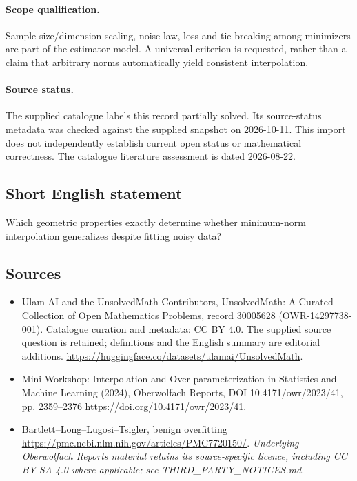 \documentclass[11pt]{article}
\begin{document}
\paragraph{Scope qualification.}
Sample-size/dimension scaling, noise law, loss and tie-breaking among minimizers are part of the estimator model. A universal criterion is requested, rather than a claim that arbitrary norms automatically yield consistent interpolation.
\paragraph{Source status.}
The supplied catalogue labels this record partially solved. Its source-status metadata was checked against the supplied snapshot on 2026-10-11. This import does not independently establish current open status or mathematical correctness. The catalogue literature assessment is dated 2026-08-22.
\subsection{Short English statement}
Which geometric properties exactly determine whether minimum-norm interpolation generalizes despite fitting noisy data?
\subsection{Sources}
\begin{itemize}
\item[S1] Ulam AI and the UnsolvedMath Contributors, UnsolvedMath: A Curated Collection of Open Mathematics Problems, record 30005628 (OWR-14297738-001). Catalogue curation and metadata: CC BY 4.0. The supplied source question is retained; definitions and the English summary are editorial additions.
\url{https://huggingface.co/datasets/ulamai/UnsolvedMath}.
\item[S2] Mini-Workshop: Interpolation and Over-parameterization in Statistics and Machine Learning​ (2024), Oberwolfach Reports, DOI 10.4171/owr/2023/41, pp. 2359--2376
\url{https://doi.org/10.4171/owr/2023/41}.
\item[S3] Bartlett--Long--Lugosi--Tsigler, benign overfitting
\url{https://pmc.ncbi.nlm.nih.gov/articles/PMC7720150/}.
\textit{Underlying Oberwolfach Reports material retains its source-specific licence, including CC BY-SA 4.0 where applicable; see THIRD\_PARTY\_NOTICES.md.}
\end{itemize}
\end{document}
